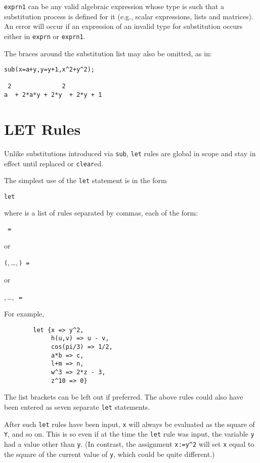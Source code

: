 \texttt{exprn1} can be any valid algebraic expression whose type is such that
a substitution process is defined for it (e.g., scalar expressions, lists
and matrices).  An error will occur if an expression of an invalid type
for substitution occurs either in \texttt{exprn} or \texttt{exprn1}.

The braces around the substitution list may also be omitted, as in:
\begin{verbatim}
sub(x=a+y,y=y+1,x^2+y^2);

 2              2
a  + 2*a*y + 2*y  + 2*y + 1
\end{verbatim}

\section{LET Rules}
\hypertarget{command:LET}{}
\hypertarget{reserved:impliesop}{}
Unlike substitutions introduced via \texttt{sub}, \texttt{let}
rules are global in scope and stay in effect until replaced or \texttt{clear}ed.

The simplest use of the \texttt{let} statement is in the form
\begin{syntax}
  \texttt{let }
\end{syntax}
where  is a list of rules separated by commas, each
of the form:
\begin{syntax}
  \texttt{ = }
\end{syntax}
or
\begin{syntax}
  \texttt{(},\,\dots,\,\texttt{)
    = }
\end{syntax}
or
\begin{syntax}
  ,\,\dots,\,\texttt{
    = }
\end{syntax}
For example,
\begin{verbatim}
        let {x => y^2,
             h(u,v) => u - v,
             cos(pi/3) => 1/2,
             a*b => c,
             l+m => n,
             w^3 => 2*z - 3,
             z^10 => 0}
\end{verbatim}
The list brackets can be left out if preferred.  The above rules could
also have been entered as seven separate \texttt{let} statements.

After such \texttt{let} rules have been input, \texttt{x} will always be
evaluated as the square of \texttt{Y}, and so on.  This is so even if at the
time the \texttt{let} rule was input, the variable \texttt{y} had a value other
than \texttt{y}. (In contrast, the assignment \texttt{x:=y\textasciicircum2} 
will set \texttt{x}
equal to the square of the current value of \texttt{y}, which could be quite
different.)

